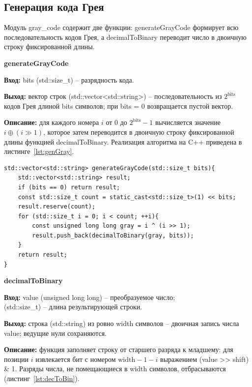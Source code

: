\documentclass[14pt,a4paper]{extreport}
\newcommand{\code}[1]{{\ttfamily #1}}
\newcommand{\xor}{\mathbin{\oplus}}
\newcommand{\shr}{\mathbin{\gg}}
\begin{document}
\subsection{Генерация кода Грея}

Модуль \code{gray\_code} содержит две функции: \code{generateGrayCode} формирует всю последовательность кодов Грея, а \code{decimalToBinary} переводит число в двоичную строку фиксированной длины.

\textbf{generateGrayCode}

\textbf{Вход:} \code{bits} (\code{std::size\_t}) -- разрядность кода.

\textbf{Выход:} вектор строк (\code{std::vector<std::string>}) -- последовательность из $2^{\text{bits}}$ кодов Грея длиной \code{bits} символов; при \code{bits = 0} возвращается пустой вектор.

\textbf{Описание:} для каждого номера $i$ от $0$ до $2^{\text{bits}}-1$ вычисляется значение $i\xor(i\shr 1)$, которое затем переводится в двоичную строку фиксированной длины функцией \code{decimalToBinary}.
Реализация алгоритма на C++ приведена в листинге~\ref{lst:genGray}.

\begin{listing}[H]
\caption{Функция \code{generateGrayCode} (gray\_code.cpp)}\label{lst:genGray}
\begin{lstlisting}
std::vector<std::string> generateGrayCode(std::size_t bits){
    std::vector<std::string> result;
    if (bits == 0) return result;
    const std::size_t count = static_cast<std::size_t>(1) << bits;
    result.reserve(count);
    for (std::size_t i = 0; i < count; ++i){
        const unsigned long long gray = i ^ (i >> 1);
        result.push_back(decimalToBinary(gray, bits));
    }
    return result;
}
\end{lstlisting}
\end{listing}

\textbf{decimalToBinary}

\textbf{Вход:} \code{value} (\code{unsigned long long}) -- преобразуемое число;\\
\noindent \code{width} (\code{std::size\_t}) -- длина результирующей строки.

\textbf{Выход:} строка (\code{std::string}) из ровно \code{width} символов -- двоичная запись числа \code{value}; ведущие нули сохраняются.

\textbf{Описание:} функция заполняет строку от старшего разряда к младшему: для позиции $i$ извлекается бит с номером $\text{width}-1-i$ выражением \code{(value >{}> shift) \& 1}. Разряды числа, не помещающиеся в \code{width} символов, отбрасываются (листинг~\ref{lst:decToBin}).
\end{document}
